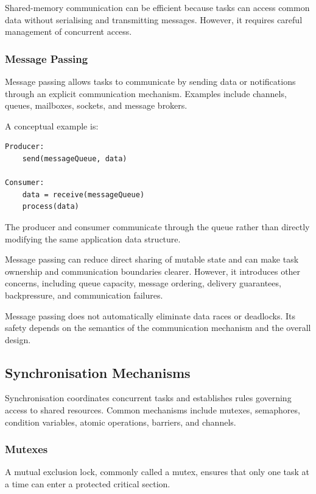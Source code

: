 Shared-memory communication can be efficient because tasks can access common data without serialising and transmitting messages. However, it requires careful management of concurrent access.

\subsubsection{Message Passing}

Message passing allows tasks to communicate by sending data or notifications through an explicit communication mechanism. Examples include channels, queues, mailboxes, sockets, and message brokers.

A conceptual example is:

\begin{lstlisting}
Producer:
    send(messageQueue, data)

Consumer:
    data = receive(messageQueue)
    process(data)
\end{lstlisting}

The producer and consumer communicate through the queue rather than directly modifying the same application data structure.

Message passing can reduce direct sharing of mutable state and can make task ownership and communication boundaries clearer. However, it introduces other concerns, including queue capacity, message ordering, delivery guarantees, backpressure, and communication failures.

Message passing does not automatically eliminate data races or deadlocks. Its safety depends on the semantics of the communication mechanism and the overall design.

\subsection{Synchronisation Mechanisms}

Synchronisation coordinates concurrent tasks and establishes rules governing access to shared resources. Common mechanisms include mutexes, semaphores, condition variables, atomic operations, barriers, and channels.

\subsubsection{Mutexes}

A mutual exclusion lock, commonly called a mutex, ensures that only one task at a time can enter a protected critical section.

